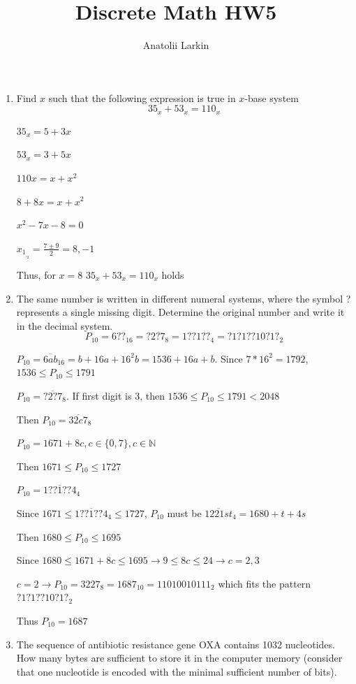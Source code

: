 \documentclass[12pt]{article}
\title{Discrete Math HW5}
\author{Anatolii Larkin}
\begin{document}
\maketitle


\begin{enumerate}

\item Find \(x\) such that the following expression is true in \(x\)-base system
\[ 35_{x} + 53_{x} = 110_{x} \]

$35_x = 5 + 3x$

$53_x = 3 + 5x$

$110x = x + x^2$

$8+8x = x + x^2$

$x^2 - 7x - 8 = 0$

$x_1_,_2 = \frac{7\pm 9}{2} = 8, -1$

Thus, for $x=8$ $35_x + 53_x = 110_x$ holds


\item The same number is written in different numeral systems, where the symbol ? represents a single missing digit. Determine the original number and write it in the decimal system.
\[ P_{10} = 6??_{16} = ?2?7_{8} = 1??1??_{4} = ?1?1??10?1?_{2} \]

$P_{10} = \overline{6ab}_{16} = b + 16a+ 16^2b = 1536 + 16a + b$. Since $7* 16^2 = 1792$, $1536 \leq P_{10} \leq 1791$

$P_{10} = \overline{?2?7}_8$. If first digit is 3, then $1536 \leq P_{10} \leq 1791 < 2048$

Then $P_{10} = \overline{32c7}_8$

$P_{10} = 1671 + 8c, c \in \{0,7\}, c \in \mathbb{N}$

Then $1671 \leq P_{10} \leq 1727$

$P_{10} = \overline{1??1??4}_4$

Since $1671 \leq \overline{1??1??4}_4 \leq 1727$, $P_{10}$ must be $\overline{1221st}_4 = 1680 + t + 4s$

Then $1680 \leq P_{10} \leq 1695$

Since $1680 \leq 1671 + 8c \leq 1695 \rightarrow 9 \leq 8c \leq 24 \rightarrow c = 2,3$

$c = 2 \rightarrow P_{10} = 3227_8 = 1687_{10} = 11010010111_2$ which fits the pattern $?1?1??10?1?_{2}$

Thus $P_{10} = 1687$


\item The sequence of antibiotic resistance gene OXA contains 1032 nucleotides. How many bytes are sufficient to store it in the computer memory (consider that one nucleotide is encoded with the minimal sufficient number of bits).


\end{enumerate}
\end{document}

